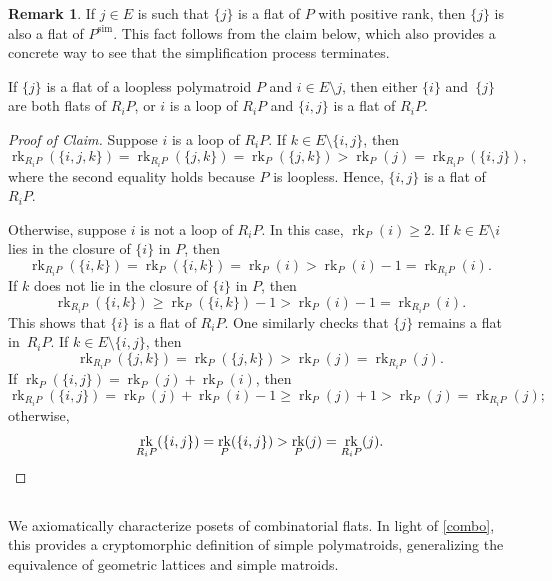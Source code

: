 \documentclass[11pt]{article}
\theoremstyle{definition}
\newtheorem{rema}[theo]{Remark}
\numberwithin{equation}{section}
\newcommand{\simp}{\mathrm{sim}}
\DeclareMathOperator{\rk}{rk}
\begin{document}
\begin{rema}
  If $j \in E$ is such that $\{j\}$ is a flat of $P$ with positive rank, then $\{j\}$ is also a flat of $P^\simp$.
  This fact follows from the claim below, which also provides a concrete way to see that the simplification process terminates.
    \begin{claim}
    If $\{j\}$ is a flat of a loopless polymatroid $P$ and $i \in E \setminus j$, then either $\{i\}$ and~$\{j\}$ are both flats of $R_i P$, or $i$ is a loop of $R_i P$ and $\{i,j\}$ is a flat of $R_i P$.
  \end{claim}
  \begin{proof}[Proof of Claim]
    Suppose $i$ is a loop of $R_i P$.
    If $k \in E \setminus \{i,j\}$, then
    \[ \rk_{R_i P}(\{i,j,k\}) = \rk_{R_i P}(\{j,k\}) = \rk_P(\{j,k\}) > \rk_P(j) = \rk_{R_i P}(\{i,j\}), \]
    where the second equality holds because $P$ is loopless. Hence, $\{i,j\}$ is a flat of $R_i P$.

    Otherwise, suppose $i$ is not a loop of $R_i P$. In this case, $\rk_P(i) \geq 2$.
    If $k \in E \setminus i$ lies in the closure of $\{i\}$ in $P$, then
    \[
      \rk_{R_i P}(\{i,k\}) = \rk_P(\{i,k\}) = \rk_P(i) > \rk_P(i) - 1 = \rk_{R_i P}(i).
    \]
    If $k$ does not lie in the closure of $\{i\}$ in $P$, then
    \[
      \rk_{R_i P}(\{i,k\}) \geq \rk_P(\{i,k\}) - 1 > \rk_P(i) - 1 = \rk_{R_i P}(i).
    \]
    This shows that $\{i\}$ is a flat of $R_i P$. One similarly checks that $\{j\}$ remains a flat in~$R_i P$.
    If $k \in E \setminus \{i,j\}$, then
    \[
      \rk_{R_i P}(\{j,k\}) = \rk_P(\{j,k\}) > \rk_P(j) = \rk_{R_i P}(j).
    \]
    If $\rk_P(\{i,j\}) = \rk_P(j) + \rk_P(i)$, then
    \[
      \rk_{R_i P}(\{i,j\}) = \rk_P(j) + \rk_P(i) - 1 \geq \rk_P(j) + 1 > \rk_P(j) = \rk_{R_i P}(j);
    \]
    otherwise,
    \[
      \rk_{R_i P}(\{i,j\}) = \rk_P(\{i,j\}) > \rk_P(j) = \rk_{R_i P}(j).\qedhere
    \]
  \end{proof}
\end{rema}

\subsection{}\label{comboflataxioms}
We axiomatically characterize posets of combinatorial flats.
In light of \cref{combo}, this provides a cryptomorphic definition of simple polymatroids, generalizing the equivalence of geometric lattices and simple matroids.
\end{document}
